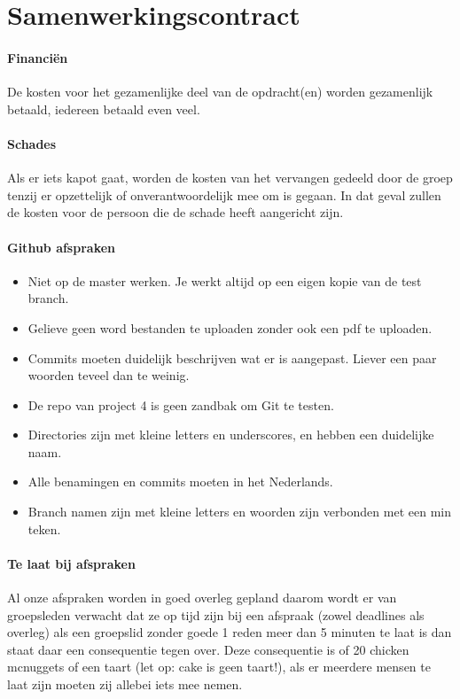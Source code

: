 \documentclass{article}
\begin{document}
\section{Samenwerkingscontract}

\paragraph{Financi\"en}

De kosten voor het gezamenlijke deel van de opdracht(en) worden gezamenlijk betaald, iedereen betaald even veel.

\paragraph{Schades}

Als er iets kapot gaat, worden de kosten van het vervangen gedeeld door de groep tenzij er opzettelijk of onverantwoordelijk mee om is gegaan.
In dat geval zullen de kosten voor de persoon die de schade heeft aangericht zijn.

\paragraph{Github afspraken}

\begin{itemize}
\item Niet op de master werken. Je werkt altijd op een eigen kopie van de test branch.
\item Gelieve geen word bestanden te uploaden zonder ook een pdf te uploaden.
\item Commits moeten duidelijk beschrijven wat er is aangepast. Liever een paar woorden teveel dan te weinig.
\item De repo van project 4 is geen zandbak om Git te testen.
\item Directories zijn met kleine letters en underscores, en hebben een duidelijke naam.
\item Alle benamingen en commits moeten in het Nederlands.
\item Branch namen zijn met kleine letters en woorden zijn verbonden met een min teken.
\end{itemize}

\paragraph{Te laat bij afspraken}

Al onze afspraken worden in goed overleg gepland daarom wordt er van groepsleden verwacht
dat ze op tijd zijn bij een afspraak (zowel deadlines als overleg) als een groepslid zonder goede
1
reden meer dan 5 minuten te laat is dan staat daar een consequentie tegen over. Deze
consequentie is of 20 chicken mcnuggets of een taart (let op: cake is geen taart!), als er
meerdere mensen te laat zijn moeten zij allebei iets mee nemen.
\end{document}
